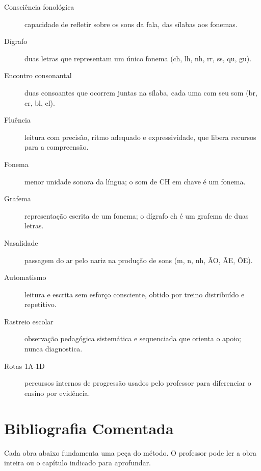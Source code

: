 \begin{description}
  \item[Consciência fonológica] capacidade de refletir sobre os sons da fala, das sílabas aos fonemas.
  \item[Dígrafo] duas letras que representam um único fonema (ch, lh, nh, rr, ss, qu, gu).
  \item[Encontro consonantal] duas consoantes que ocorrem juntas na sílaba, cada uma com seu som (br, cr, bl, cl).
  \item[Fluência] leitura com precisão, ritmo adequado e expressividade, que libera recursos para a compreensão.
  \item[Fonema] menor unidade sonora da língua; o som de CH em chave é um fonema.
  \item[Grafema] representação escrita de um fonema; o dígrafo ch é um grafema de duas letras.
  \item[Nasalidade] passagem do ar pelo nariz na produção de sons (m, n, nh, ÃO, ÃE, ÕE).
  \item[Automatismo] leitura e escrita sem esforço consciente, obtido por treino distribuído e repetitivo.
  \item[Rastreio escolar] observação pedagógica sistemática e sequenciada que orienta o apoio; nunca diagnostica.
  \item[Rotas 1A-1D] percursos internos de progressão usados pelo professor para diferenciar o ensino por evidência.
\end{description}

\chapter{Bibliografia Comentada}

Cada obra abaixo fundamenta uma peça do método. O professor pode ler a obra inteira ou o capítulo indicado para aprofundar.

